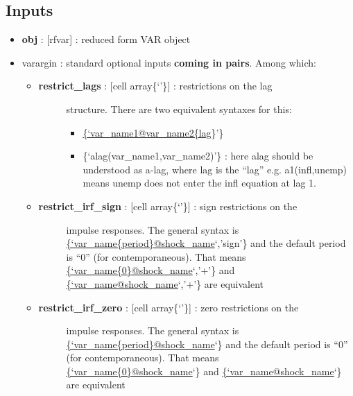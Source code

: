 \documentclass[letterpaper,10pt,english]{sphinxmanual}
\begin{document}
\subsection{Inputs}
\label{classes/models/@rfvar/rfvar:id148}\begin{itemize}
\item {} 
\textbf{obj} : {[}rfvar{]} : reduced form VAR object

\item {} 
varargin : standard optional inputs \textbf{coming in pairs}. Among which:
\begin{itemize}
\item {} \begin{description}
\item[{\textbf{restrict\_lags} : {[}cell array\textbar{}\{`'\}{]} : restrictions on the lag}] \leavevmode
structure. There are two equivalent syntaxes for this:
\begin{itemize}
\item {} 
\href{mailto:\{'var\_name1@var\_name2\{lag}{\{`var\_name1@var\_name2\{lag}\}'\}

\item {} 
\{`alag(var\_name1,var\_name2)'\} : here alag should be understood as
a-lag, where lag is the ``lag'' e.g. a1(infl,unemp) means unemp
does not enter the infl equation at lag 1.

\end{itemize}

\end{description}

\item {} \begin{description}
\item[{\textbf{restrict\_irf\_sign} : {[}cell array\textbar{}\{`'\}{]} : sign restrictions on the}] \leavevmode
impulse responses. The general syntax is
\href{mailto:\{'var\_name\{period\}@shock\_name}{\{`var\_name\{period\}@shock\_name}`,'sign'\} and the default period is
``0'' (for contemporaneous). That means
\href{mailto:\{'var\_name\{0\}@shock\_name}{\{`var\_name\{0\}@shock\_name}`,'+'\} and \href{mailto:\{'var\_name@shock\_name}{\{`var\_name@shock\_name}`,'+'\}
are equivalent

\end{description}

\item {} \begin{description}
\item[{\textbf{restrict\_irf\_zero} : {[}cell array\textbar{}\{`'\}{]} : zero restrictions on the}] \leavevmode
impulse responses. The general syntax is
\href{mailto:\{'var\_name\{period\}@shock\_name}{\{`var\_name\{period\}@shock\_name}`\} and the default period is
``0'' (for contemporaneous). That means
\href{mailto:\{'var\_name\{0\}@shock\_name}{\{`var\_name\{0\}@shock\_name}`\} and \href{mailto:\{'var\_name@shock\_name}{\{`var\_name@shock\_name}`\}
are equivalent


\end{description}
\end{itemize}
\end{itemize}
\end{document}
